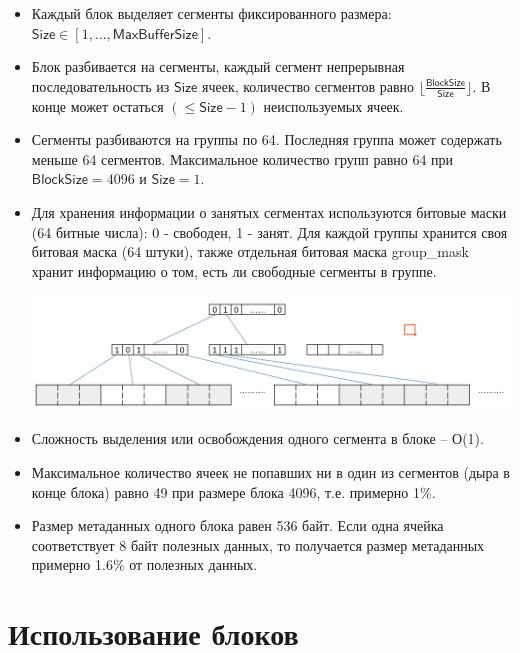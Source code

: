 \documentclass[12pt, a4paper]{article}
\begin{document}
	\begin{itemize}
		\item Каждый блок выделяет сегменты фиксированного размера: 
		$\textsf{Size} \in \left[ 1,\ldots ,\textsf{MaxBufferSize}\right] $.
	
		\item Блок разбивается на сегменты, каждый сегмент непрерывная последовательность из $\textsf{Size}$ ячеек,
		количество сегментов равно $ \lfloor\frac{\textsf{BlockSize}}{\textsf{Size}}\rfloor $.
		В конце может остаться $(\leq \textsf{Size} - 1)$ неиспользуемых ячеек.
	
		\item Сегменты разбиваются на группы по 64. Последняя группа может содержать меньше 64 сегментов.
		Максимальное количество групп равно 64 при $\textsf{BlockSize} = 4096$ и $\textsf{Size}=1$.
	
		\item Для хранения информации о занятых сегментах используются битовые маски (64 битные числа):
		0 - свободен, 1 - занят. Для каждой группы хранится своя битовая маска (64 штуки), также отдельная битовая маска
		\textsf{group\_mask} хранит информацию о том, есть ли свободные сегменты в группе.
			
		\includegraphics[scale=0.15]{block.png}
		
		\item Сложность выделения или освобождения одного сегмента в блоке -- О(1).
		
		\item Максимальное количество ячеек не попавших ни в один из сегментов (дыра в конце блока) равно 49 
		при размере блока 4096, т.е. примерно 1\%.
		
		\item Размер метаданных одного блока равен 536 байт. Если одна ячейка соответствует 8 байт полезных
		данных, то получается размер метаданных примерно 1.6\% от полезных данных.
	\end{itemize}

	\section{Использование блоков}
	
\end{document}
